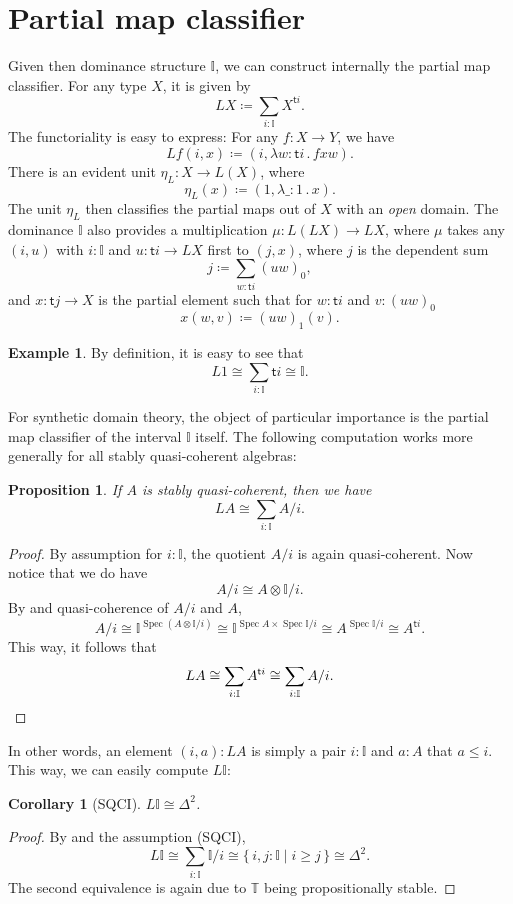 \documentclass[a4paper,12pt]{amsart}
\newtheorem{corollary}[theorem]{Corollary}
\newtheorem{proposition}[theorem]{Proposition}
\theoremstyle{definition}
\newtheorem{example}[theorem]{Example}
\newcommand{\mbb}[1]{\mathbb{#1}}
\newcommand{\T}{\mbb T}
\newcommand{\I}{\mbb I}
\newcommand{\ms}[1]{\mathsf{#1}}
\newcommand{\scomp}[2]{\{\,#1\mid#2\,\}}
\newcommand{\ld}[2]{\lambda #1\!\colon\!\!#2\mathpunct{.}}
\newcommand{\spec}{\operatorname{Spec}}
\begin{document}
\section{Partial map classifier}\label{sec:lifting}
Given then dominance structure $\I$, we can construct internally the partial map classifier. For any type $X$, it is given by
\[ L X \coloneq \sum_{i:\I}X^{\ms ti}. \]
The functoriality is easy to express: For any $f \colon X \to Y$, we have
\[ L f(i,x) \coloneq (i,\ld{w}{\ms ti}fxw). \]
There is an evident unit $\eta_L \colon X \to L(X)$, where
\[ \eta_L(x) \coloneq (1,\ld\_ 1 x). \]
The unit $\eta_L$ then classifies the partial maps out of $X$ with an \emph{open} domain. The dominance $\I$ also provides a multiplication $\mu \colon L(L X) \to L X$, where $\mu$ takes any $(i,u)$ with $i : \I$ and $u \colon \ms ti \to L X$ first to $(j,x)$, where $j$ is the dependent sum
\[ j \coloneq \sum_{w:\ms ti} (uw)_0, \]
and $x \colon \ms tj \to X$ is the partial element such that for $w : \ms ti$ and $v : (uw)_0$
\[ x(w,v) \coloneq (uw)_1(v). \]

\begin{example}
  By definition, it is easy to see that
  \[ L 1 \cong \sum_{i:\I}\ms ti \cong \I. \]
\end{example}

For synthetic domain theory, the object of particular importance is the partial map classifier of the interval $\I$ itself. The following computation works more generally for all stably quasi-coherent algebras:

\begin{proposition}\label{prop:liftingofalgebra}
  If $A$ is stably quasi-coherent, then we have
  \[ L A \cong \sum_{i:\I}A/i. \]
\end{proposition}
\begin{proof}
  By assumption for $i : \I$, the quotient $A/i$ is again quasi-coherent. Now notice that we do have
  \[ A/i \cong A \otimes \I/i. \]
  By  and quasi-coherence of $A/i$ and $A$,
  \[ A/i \cong \I^{\spec(A \otimes \I/i)} \cong \I^{\spec A \times \spec\I/i} \cong A^{\spec \I/i} \cong A^{\ms ti}. \]
  This way, it follows that 
  \[ L A \cong \sum_{i:\I}A^{\ms ti} \cong \sum_{i:\I}A/i. \qedhere \]
\end{proof}

In other words, an element $(i,a) : L A$ is simply a pair $i : \I$ and $a : A$ that $a \le i$. This way, we can easily compute $L \I$:

\begin{corollary}[SQCI]
  $L \I \cong \Delta^2$.
\end{corollary}
\begin{proof}
  By  and the assumption (SQCI),
  \[ L\I \cong \sum_{i:\I}\I/i \cong \scomp{i,j : \I}{i \ge j} \cong \Delta^2. \]
  The second equivalence is again due to $\T$ being propositionally stable.
\end{proof}
\end{document}
